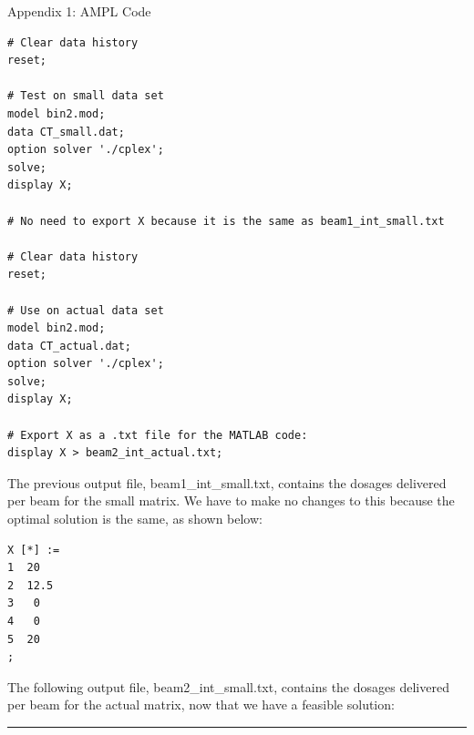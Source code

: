 \documentclass[12pt]{article}
\makeatletter
\newenvironment{task}{\@startsection
       {section}{1}
       {0.4em}{-.5ex plus -1ex minus -.2ex}{.5ex plus .2ex}
       {\pagebreak[3]\large\bf\noindent{Task}}}
       {\nopagebreak[3]\vspace{3ex}\begin{center}\rule{1\linewidth}{.3pt}\end{center}}
\makeatother
\begin{document}
\begin{task}{Appendix 1: AMPL Code}
\begin{enumerate}
\begin{lstlisting}
# Clear data history
reset;

# Test on small data set
model bin2.mod;
data CT_small.dat;
option solver './cplex';
solve;
display X;

# No need to export X because it is the same as beam1_int_small.txt

# Clear data history
reset;

# Use on actual data set
model bin2.mod;
data CT_actual.dat;
option solver './cplex';
solve;
display X;

# Export X as a .txt file for the MATLAB code:
display X > beam2_int_actual.txt;
\end{lstlisting}

The previous output file, beam1\_int\_small.txt, contains the dosages delivered per beam for the small matrix. We have to make no changes to this because the optimal solution is the same, as shown below:

\begin{lstlisting}
X [*] :=
1  20
2  12.5
3   0
4   0
5  20
;
\end{lstlisting}

The following output file, beam2\_int\_small.txt, contains the dosages delivered per beam for the actual matrix, now that we have a feasible solution:


\end{enumerate}
\end{task}
\end{document}
